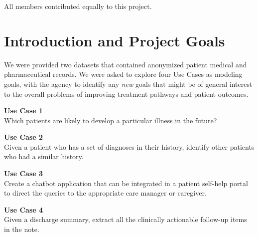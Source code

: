 \documentclass[twoside,11pt]{article}
\begin{document}
\begin{center}
	\small{All members contributed equally to this project.}
\end{center}


\newpage

\tableofcontents


\newpage

\section{Introduction and Project Goals} \label{section:introduction}

We were provided two datasets that contained anonymized patient medical and pharmaceutical records. We were asked to explore four Use Cases as modeling goals, with the agency to identify any \textit{new} goals that might be of general interest to the overall problems of improving treatment pathways and patient outcomes.


\begin{adjustwidth}{25pt}{25pt}
\textbf{Use Case 1}\\
Which patients are likely to develop a particular illness in the future?

\textbf{Use Case 2}\\
Given a patient who has a set of diagnoses in their history, identify other patients who had a similar history.

\textbf{Use Case 3}\\
Create a chatbot application that can be integrated in a patient self-help portal to direct the queries to the appropriate care manager or caregiver.

\textbf{Use Case 4}\\
Given a discharge summary, extract all the clinically actionable follow-up items in the note.
\end{adjustwidth}
\end{document}
